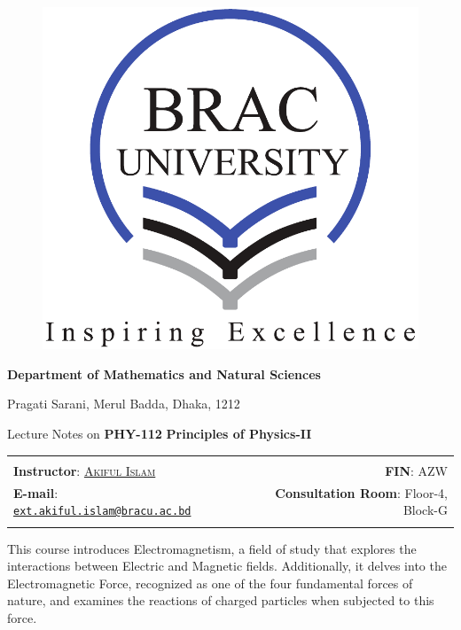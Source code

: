 \documentclass[12pt,b4paper]{article}
\begin{document}
\thispagestyle{empty}
\bigskip \
\vspace{0.1cm}
\noindent
	\begin{figure}
	    \centering
	    \includegraphics[width=.4\linewidth]{bracu_logo.pdf}\end{figure}
     \vspace{-.3
     in}
	\begin{center}
         {\fontsize{22}{22} \selectfont \bf \sffamily Department of Mathematics and Natural Sciences} \par
         \vspace{0.06in}
         \large\sc Pragati Sarani, Merul Badda, Dhaka, 1212\par
	\end{center}
\vskip 15pt
\begin{center}
    {\fontsize{20}{20} \selectfont Lecture Notes on \fontsize{20}{20} \selectfont \bf \sffamily \textcolor{darkmidnightblue}{PHY-112}}
    \vskip 16pt
    {\fontsize{25}{25}\selectfont \sffamily\bf \textcolor{darkmidnightblue}{Principles of Physics-II}}
    \vskip 15pt
    \begin{tabular*}{.96\textwidth}{@{\extracolsep{\fill}}lr}
    \hline\hline\\

\large
\textbf{Instructor}: \href{mailto:ext.akiful.islam@bracu.ac.bd}{\textsc{Akiful Islam}} & \large \textbf{FIN}: \textcolor{americanrose}{AZW}\\[10pt]
\large \textbf{E-mail}: \href{mailto:ext.akiful.islam@bracu.ac.bd}{\texttt{ext.akiful.islam@bracu.ac.bd}} & \large \textbf{Consultation Room}: \textcolor{americanrose}{Floor-4, Block-G}\\
&  \\
\hline\hline
\end{tabular*}
\vskip 20pt
\end{center}
This course introduces Electromagnetism, a field of study that explores the interactions between Electric and Magnetic fields. Additionally, it delves into the Electromagnetic Force, recognized as one of the four fundamental forces of nature, and examines the reactions of charged particles when subjected to this force.
\end{document}
